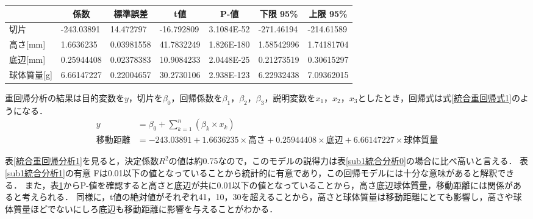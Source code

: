 \documentclass[titlepage,a4paper]{jsarticle}
\begin{document}
\begin{table}[H]
\begin{minipage}[c]{1\hsize}
    \centering
    \label{sub2統合分析1}
    \begin{tabular}{l|llllll}
      \multicolumn{1}{c|}{} & \multicolumn{1}{c}{係数} & \multicolumn{1}{c}{標準誤差} & \multicolumn{1}{c}{t値} & \multicolumn{1}{c}{P-値} & \multicolumn{1}{c}{下限 95\%} & \multicolumn{1}{c}{上限 95\%} \\\hline\hline
      切片                    & -243.03891             & 14.472797                & -16.792809             & 3.1084E-52              & -271.46194                  & -214.61589                  \\
      高さ{[}mm{]}            & 1.6636235              & 0.03981558               & 41.7832249             & 1.826E-180              & 1.58542996                  & 1.74181704                  \\
      底辺{[}mm{]}            & 0.25944408             & 0.02378383               & 10.9084233             & 2.0448E-25              & 0.21273519                  & 0.30615297                  \\
      球体質量{[}g{]}           & 6.66147227             & 0.22004657               & 30.2730106             & 2.938E-123              & 6.22932438                  & 7.09362015                  \\\hline
    \end{tabular}
  \end{minipage}
\end{table}

重回帰分析の結果は目的変数を$y$，切片を$\beta_{0}$，回帰係数を$\beta_{1}$，$\beta_{2}$，$\beta_{3}$，説明変数を$x_{1}$，$x_{2}$，$x_{3}$としたとき，回帰式は式\eqref{統合重回帰式1}のようになる．
\begin{align}
  y    & = \beta_{0}+\sum_{k=1}^{n}\left(\beta_{k} \times x_{k}\right)                                     \\
  移動距離 & = -243.03891 + 1.6636235  \times 高さ+ 0.25944408 \times 底辺 + 6.66147227 \times 球体質量\label{統合重回帰式1}
\end{align}

表\ref{統合重回帰分析1}を見ると，決定係数$R^{2}$の値は約0.75なので，このモデルの説得力は表\ref{sub1統合分析0}の場合に比べ高いと言える．
表\ref{sub1統合分析1}の有意 Fは0.01以下の値となっていることから統計的に有意であり，この回帰モデルには十分な意味があると解釈できる．
また，表\ref{sub2統合分析1}からP-値を確認すると高さと底辺が共に0.01以下の値となっていることから，高さ底辺球体質量，移動距離には関係があると考えられる．
同様に，t値の絶対値がそれぞれ41，10，30を超えることから，高さと球体質量は移動距離にとても影響し，高さや球体質量ほどでないにしろ底辺も移動距離に影響を与えることがわかる．
\end{document}
